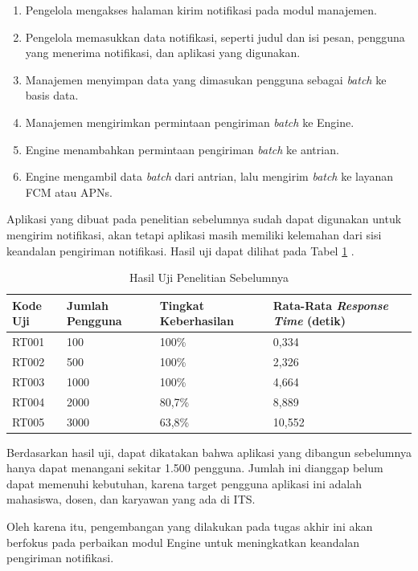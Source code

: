 \begin{enumerate}
	\item Pengelola mengakses halaman kirim notifikasi pada modul manajemen.
	\item Pengelola memasukkan data notifikasi, seperti judul dan isi pesan, pengguna yang menerima notifikasi, dan aplikasi yang digunakan.
	\item Manajemen menyimpan data yang dimasukan pengguna sebagai \textit{batch} ke basis data.
	\item Manajemen mengirimkan permintaan pengiriman \textit{batch} ke Engine.
	\item Engine menambahkan permintaan pengiriman \textit{batch} ke antrian.
	\item Engine mengambil data \textit{batch} dari antrian, lalu mengirim \textit{batch} ke layanan FCM atau APNs.
\end{enumerate}
\par Aplikasi yang dibuat pada penelitian sebelumnya sudah dapat digunakan untuk mengirim notifikasi, akan tetapi aplikasi masih memiliki kelemahan dari sisi keandalan pengiriman notifikasi. Hasil uji dapat dilihat pada Tabel \ref{t:hasil_uji_sebelum} \cite{application-thesis}.
\begin{longtable}{|p{1.5cm}|p{2cm}|p{2cm}|p{2.5cm}|}
	\caption{Hasil Uji Penelitian Sebelumnya} \label{t:hasil_uji_sebelum} \\ \hline
	\rowcolor{lightgray} Kode Uji & Jumlah Pengguna & Tingkat Keberhasilan & Rata-Rata \textit{Response Time} (detik) \\ \hline
	RT001 & 100 & 100\% & 0,334 \\ \hline
	RT002 & 500 & 100\% & 2,326 \\ \hline
	RT003 & 1000 & 100\% & 4,664 \\ \hline
	RT004 & 2000 & 80,7\% & 8,889 \\ \hline
	RT005 & 3000 & 63,8\% & 10,552 \\ \hline
\end{longtable}
\par Berdasarkan hasil uji, dapat dikatakan bahwa aplikasi yang dibangun sebelumnya hanya dapat menangani sekitar 1.500 pengguna. Jumlah ini dianggap belum dapat memenuhi kebutuhan, karena target pengguna aplikasi ini adalah mahasiswa, dosen, dan karyawan yang ada di ITS.
\par Oleh karena itu, pengembangan yang dilakukan pada tugas akhir ini akan berfokus pada perbaikan modul Engine untuk meningkatkan keandalan pengiriman notifikasi.

